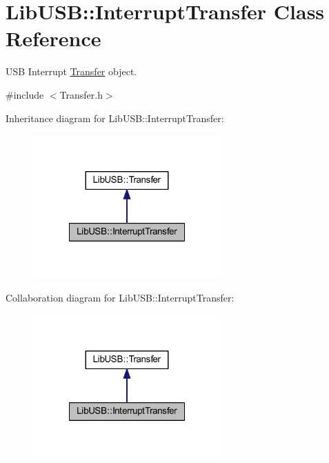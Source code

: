 \hypertarget{class_lib_u_s_b_1_1_interrupt_transfer}{\section{Lib\-U\-S\-B\-:\-:Interrupt\-Transfer Class Reference}
\label{class_lib_u_s_b_1_1_interrupt_transfer}
}


U\-S\-B Interrupt \hyperlink{class_lib_u_s_b_1_1_transfer}{Transfer} object.  




{\ttfamily \#include $<$Transfer.\-h$>$}



Inheritance diagram for Lib\-U\-S\-B\-:\-:Interrupt\-Transfer\-:\nopagebreak
\begin{figure}[H]
\begin{center}
\leavevmode
\includegraphics[width=204pt]{class_lib_u_s_b_1_1_interrupt_transfer__inherit__graph}
\end{center}
\end{figure}


Collaboration diagram for Lib\-U\-S\-B\-:\-:Interrupt\-Transfer\-:\nopagebreak
\begin{figure}[H]
\begin{center}
\leavevmode
\includegraphics[width=204pt]{class_lib_u_s_b_1_1_interrupt_transfer__coll__graph}
\end{center}
\end{figure}
